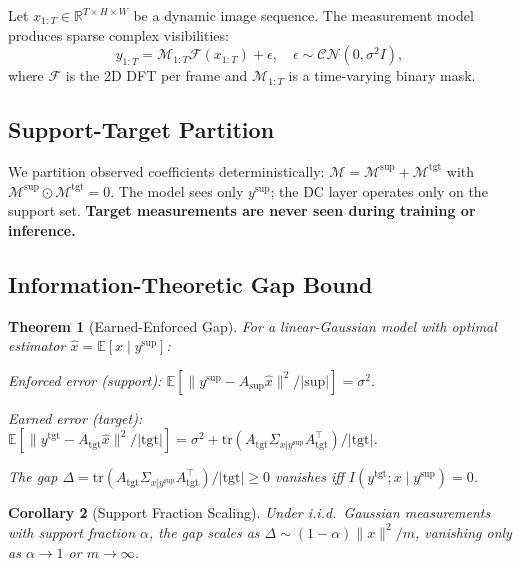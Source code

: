 \documentclass[11pt]{article}
\newtheorem{theorem}{Theorem}
\newtheorem{corollary}[theorem]{Corollary}
\begin{document}
Let $x_{1:T} \in \mathbb{R}^{T \times H \times W}$ be a dynamic image sequence. The measurement model produces sparse complex visibilities:
\begin{equation}
y_{1:T} = \mathcal{M}_{1:T}\mathcal{F}(x_{1:T}) + \epsilon, \quad \epsilon \sim \mathcal{CN}(0, \sigma^2 I),
\end{equation}
where $\mathcal{F}$ is the 2D DFT per frame and $\mathcal{M}_{1:T}$ is a time-varying binary mask.

\subsection{Support-Target Partition}

We partition observed coefficients deterministically: $\mathcal{M} = \mathcal{M}^{\mathrm{sup}} + \mathcal{M}^{\mathrm{tgt}}$ with $\mathcal{M}^{\mathrm{sup}} \odot \mathcal{M}^{\mathrm{tgt}} = 0$. The model sees only $y^{\mathrm{sup}}$; the DC layer operates only on the support set. \textbf{Target measurements are never seen during training or inference.}

\subsection{Information-Theoretic Gap Bound}

\begin{theorem}[Earned-Enforced Gap]
For a linear-Gaussian model with optimal estimator $\hat{x} = \mathbb{E}[x \mid y^{\mathrm{sup}}]$:

\emph{Enforced error} (support): $\mathbb{E}[\|y^{\mathrm{sup}} - A_{\mathrm{sup}}\hat{x}\|^2 / |\mathrm{sup}|] = \sigma^2$.

\emph{Earned error} (target): $\mathbb{E}[\|y^{\mathrm{tgt}} - A_{\mathrm{tgt}}\hat{x}\|^2 / |\mathrm{tgt}|] = \sigma^2 + \mathrm{tr}(A_{\mathrm{tgt}}\Sigma_{x|y^{\mathrm{sup}}}A_{\mathrm{tgt}}^\top) / |\mathrm{tgt}|$.

The gap $\Delta = \mathrm{tr}(A_{\mathrm{tgt}}\Sigma_{x|y^{\mathrm{sup}}}A_{\mathrm{tgt}}^\top) / |\mathrm{tgt}| \geq 0$ vanishes iff $I(y^{\mathrm{tgt}}; x \mid y^{\mathrm{sup}}) = 0$.
\end{theorem}

\begin{corollary}[Support Fraction Scaling]
Under i.i.d.\ Gaussian measurements with support fraction $\alpha$, the gap scales as $\Delta \sim (1-\alpha)\|x\|^2/m$, vanishing only as $\alpha \to 1$ or $m \to \infty$.
\end{corollary}
\end{document}
